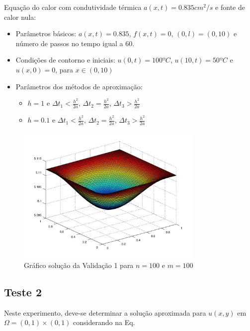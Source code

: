 \documentclass[
	11pt,				%
	oneside,			%
	a4paper,			%
	english,			%
	brazil,				%
	]{article}
\begin{document}
Equação do calor com condutividade térmica $a(x,t) = 0.835 cm^2/s$ e fonte de 
calor nula:

\begin{itemize}
 \item Parâmetros básicos:
 $a(x,t) = 0.835$, $f(x,t) = 0$, $(0,l) = (0,10)$ e número de passos no tempo 
igual a 60.
 \item Condições de contorno e iniciais:
 $u(0,t) = 100ºC$, $u(10,t) = 50ºC$ e $u(x,0) = 0$, para $x \in (0,10)$
 \item Parâmetros dos métodos de aproximação:
 \begin{itemize}
  \item $h = 1$ e $\Delta t_1 < \frac{h^2}{2a}$, $\Delta t_2 = 
\frac{h^2}{2a}$, $\Delta t_3 > \frac{h^2}{2a}$
  \item $h = 0.1$ e $\Delta t_1 < \frac{h^2}{2a}$, $\Delta t_2 = 
\frac{h^2}{2a}$, $\Delta t_3 > \frac{h^2}{2a}$
 \end{itemize}
\end{itemize}	

\begin{figure}[h]
    \centering
    \includegraphics[width=0.8\textwidth]{v1_100-100.jpg}
    \caption{Gráfico solução da Validação 1 para $n = 100$ e $m = 100$}
    \label{fig:v1_100-100}
\end{figure}

\subsection{Teste 2}
Neste experimento, deve-se determinar a solução aproximada para $u(x,y)$ em 
$\Omega = (0,1) \times (0,1)$ considerando na Eq.
\end{document}
